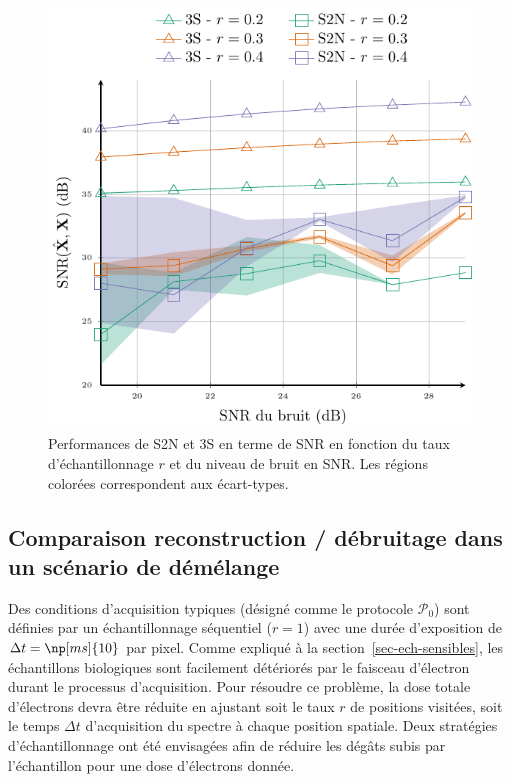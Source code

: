 \begin{figure}[h!]
    \centering
    \includegraphics{img/chapitre3/figure6/pix_ratio.pdf}
    \caption{Performances de S2N et 3S en terme de SNR en fonction du taux d'échantillonnage $r$ et du niveau de bruit en SNR. Les régions colorées correspondent aux écart-types. 
        \protect\label{fig-s2n-3s-noise-ratio}}
\end{figure}

\subsection{Comparaison reconstruction / débruitage dans un scénario de démélange}\label{sec-lr-demelange-res}

Des conditions d'acquisition typiques (désigné comme le protocole $\mathcal{P}_0$) sont définies par un échantillonnage séquentiel ($r=1$) avec une durée d'exposition de $\Delta t = \np[ms]{10}$ par pixel. Comme expliqué à la section~\ref{sec-ech-sensibles}, les échantillons biologiques sont facilement détériorés par le faisceau d'électron durant le processus d'acquisition.  Pour résoudre ce problème, la dose totale d'électrons devra être réduite en ajustant soit le taux $r$ de positions visitées, soit le temps $\Delta t$ d'acquisition du spectre à chaque position spatiale.
Deux stratégies d'échantillonnage ont été envisagées afin de réduire les dégâts subis par l'échantillon pour une dose d'électrons donnée.

